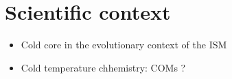 \section{Scientific context} 
\begin{itemize}
\item{Cold core in the evolutionary context of the ISM}
\item{Cold temperature chhemistry: COMs ?}
\end{itemize}
  
  
  
  